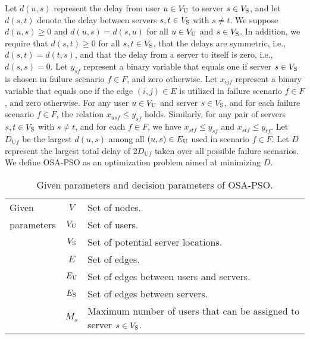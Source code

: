 \documentclass[conference]{IEEEtran}
\begin{document}
\begin{CJK}{UTF8}{ipxm}
Let $d(u,s)$ represent the delay from user $u \in V_{\rm{U}}$ to server $s \in V_{\rm{S}}$, and let $d(s,t)$ denote the delay between servers $s, t \in V_{\rm{S}}$ with $s \neq t$.
We suppose $d(u,s) \geq 0$ and $d(u,s) = d(s,u)$ for all $u \in V_{\rm{U}}$ and $s \in V_{\rm{S}}$.
In addition, we require that $d(s,t) \geq 0$ for all $s, t \in V_{\rm{S}}$, that the delays are symmetric, i.e., $d(s,t) = d(t,s)$, and that the delay from a server to itself is zero, i.e., $d(s,s) = 0$.
Let $y_{sf}$ represent a binary variable that equals one if server $s \in V_{\rm{S}}$ is chosen in failure scenario $f \in F$, and zero otherwise.
Let $x_{ijf}$ represent a binary variable that equals one if the edge $(i,j) \in E$ is utilized in failure scenario $f \in F$, and zero otherwise.
For any user $u \in V_{\rm{U}}$ and server $s \in V_{\rm{S}}$, and for each failure scenario $f \in F$, the relation $x_{usf} \le y_{sf}$ holds. 
Similarly, for any pair of servers $s, t \in V_{\rm{S}}$ with $s \neq t$, and for each $f \in F$, we have $x_{stf} \le y_{sf}$ and $x_{stf} \le y_{tf}$. 
Let $D_{\mathrm{U}f}$ be the largest $d(u,s)$ among all $(u,s) \in E_{\rm{U}}$ used in scenario $f \in F$.
Let $D$ represent the largest total delay of $2D_{\mathrm{U}f}$ taken over all possible failure scenarios.
We define OSA-PSO as an optimization problem aimed at minimizing $D$.
% 
\begin{table}[tb]
    \centering
    \caption{Given parameters and decision parameters of OSA-PSO.}
    \label{tbl:notation_OSA-PSO}
    \begin{tabular}{p{1.3cm}|cp{5.4cm}}
        \hline
        \small
        Given & $V$ & Set of nodes. \\
        parameters & $V_{\rm{U}}$ & Set of users. \\
        & $V_{\rm{S}}$ & Set of potential server locations. \\
        & $E$ & Set of edges. \\
        & $E_{\rm{U}}$ & Set of edges between users and servers. \\
        & $E_{\rm{S}}$ & Set of edges between servers. \\
        & $M_s$ & Maximum number of users that can be assigned to server $s \in V_{\rm{S}}$. \\

\end{tabular}
\end{table}
\end{CJK}
\end{document}
